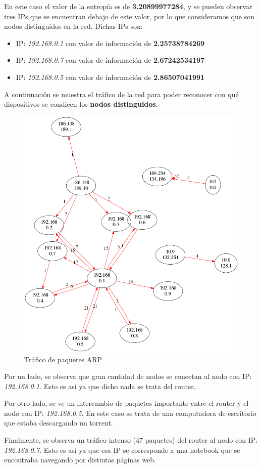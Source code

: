 En este caso el valor de la entropía es de \textbf{3.20899977284}, y se pueden observar tres IPs que se encuentran debajo de este valor, por lo que consideramos que son nodos distinguidos en la red. Dichas IPs son:
\begin{itemize}
\item IP: \textit{192.168.0.1} con valor de información de \textbf{2.25738784269}
\item IP: \textit{192.168.0.7} con valor de información de \textbf{2.67242534197}
\item IP: \textit{192.168.0.5} con valor de información de \textbf{2.86507041991}
\end{itemize}

A continuación se muestra el tráfico de la red para poder reconocer con qué dispositivos se condicen los \textbf{nodos distinguidos}.

\begin{figure}[H]
       \centering
       \includegraphics[width=1\textwidth]{../resultados/Casa/network.png}
       \caption{Tráfico de paquetes ARP}
       \label{red-hogarena-arp-traffic}
\end{figure}

Por un lado, se observa que gran cantidad de nodos se conectan al nodo con IP: \textit{192.168.0.1}. Esto es así ya que dicho nada se trata del router.

Por otro lado, se ve un intercambio de paquetes importante entre el router y el nodo con IP: \textit{192.168.0.5}. En este caso se trata de una computadora de escritorio que estaba descargando un torrent.

Finalmente, se observa un tráfico intenso (47 paquetes) del router al nodo con IP: \textit{192.168.0.7}. Esto es así ya que esa IP se corresponde a una notebook que se encontraba navegando por distintas páginas web.


